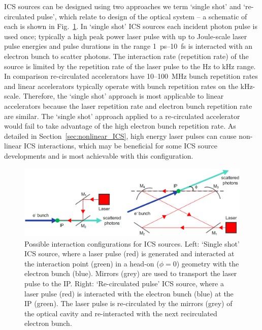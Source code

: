 \documentclass[../main.tex]{subfiles}
\begin{document}
ICS sources can be designed using two approaches we term `single shot' and `re-circulated pulse', which relate to design of the optical system -- a schematic of each is shown in Fig.~\ref{fig:single_shot_4mirror}. In `single shot' ICS sources each incident photon pulse is used once; typically a high peak power laser pulse with up to Joule-scale laser pulse energies and pulse durations in the range 1~\si{\pico\second}--10~\si{\femto\second} is interacted with an electron bunch to scatter photons. The interaction rate (repetition rate) of the source is limited by the repetition rate of the laser pulse to the \si{\hertz} to \si{\kilo\hertz} range. In comparison re-circulated accelerators have 10--100~\si{\mega\hertz} bunch repetition rates and linear accelerators typically operate with bunch repetition rates on the \si{\kilo\hertz}-scale. Therefore, the `single shot' approach is most applicable to linear accelerators because the laser repetition rate and electron bunch repetition rate are similar. The `single shot' approach applied to a re-circulated accelerator would fail to take advantage of the high electron bunch repetition rate. As detailed in Section~\ref{sec:nonlinear_ICS}, high energy laser pulses can cause non-linear ICS interactions, which may be beneficial for some ICS source developments and is most achievable with this configuration. 
\begin{figure}[!h]
\centering
\includegraphics[width=\textwidth]{Figures/Photon_Production_by_Inverse_Compton_Scattering/single_shot_4_mirror.pdf}
\caption{Possible interaction configurations for ICS sources. Left: `Single shot' ICS source, where a laser pulse (red) is generated and interacted at the interaction point (green) in a head-on ($\phi=0$) geometry with the electron bunch (blue). Mirrors (grey) are used to transport the laser pulse to the IP. Right: `Re-circulated pulse' ICS source, where a laser pulse (red) is interacted with the electron bunch (blue) at the IP (green). The laser pulse is re-circulated by the mirrors (grey) of the optical cavity and re-interacted with the next recirculated electron bunch.}
\label{fig:single_shot_4mirror}
\end{figure}
\end{document}
